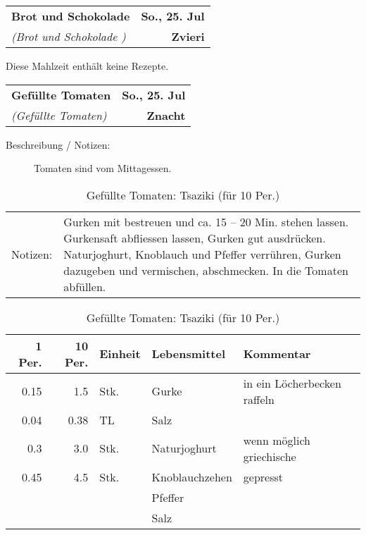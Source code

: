 \documentclass[11pt,a4paper]{article}%
\begin{document}
%
\clearpage%
\pagebreak%
\renewcommand{\arraystretch}{1.75}%
%
%


\begin{table}%
\begin{tabularx}{\textwidth}{X r}%
\LARGE \textbf{Brot und Schokolade }&\color{gray} \large \textbf{So., 25. Jul}\\%
\small \textit{(Brot und Schokolade )}&\color{gray} \large \textbf{Zvieri}\\%
\hline%
\end{tabularx}%
\end{table}

%
%
Diese Mahlzeit enthält keine Rezepte.%
\clearpage%
\pagebreak%
\renewcommand{\arraystretch}{1.75}%
%
%


\begin{table}%
\begin{tabularx}{\textwidth}{X r}%
\LARGE \textbf{Gefüllte Tomaten}&\color{gray} \large \textbf{So., 25. Jul}\\%
\small \textit{(Gefüllte Tomaten)}&\color{gray} \large \textbf{Znacht}\\%
\hline%
\end{tabularx}%
\end{table}

%
\begin{description}%
\item[Beschreibung / Notizen:]%
Tomaten sind vom Mittagessen.%
\end{description}%
\vspace{0.75cm}%
\renewcommand{\arraystretch}{1.25}%


\begin{table}[h]%
\caption{Gefüllte Tomaten: Tsaziki (für 10 Per.)}%
\begin{tabularx}{\textwidth}{l X}%
Notizen:&Gurken mit bestreuen und ca. 15 – 20 Min. stehen lassen. Gurkensaft abfliessen lassen, Gurken gut ausdrücken.\newline%
Naturjoghurt, Knoblauch und Pfeffer verrühren, Gurken dazugeben und vermischen, abschmecken. In die Tomaten abfüllen.\\%
\end{tabularx}%
\par%
\begin{tabularx}{\textwidth}{| r | r | l | l | X |}%
\hline%
\tiny{1 Per.}&\tiny{10 Per.}&\tiny{Einheit}&\tiny{Lebensmittel}&\tiny{Kommentar}\\%
\hline%
0.15&1.5&Stk.&Gurke&in ein Löcherbecken raffeln\\%
\hline%
0.04&0.38&TL&Salz&\\%
\hline%
0.3&3.0&Stk.&Naturjoghurt&wenn möglich griechische\\%
\hline%
0.45&4.5&Stk.&Knoblauchzehen&gepresst\\%
\hline%
&&&Pfeffer&\\%
\hline%
&&&Salz&\\%
\hline%
\end{tabularx}%
\end{table}
\end{document}
